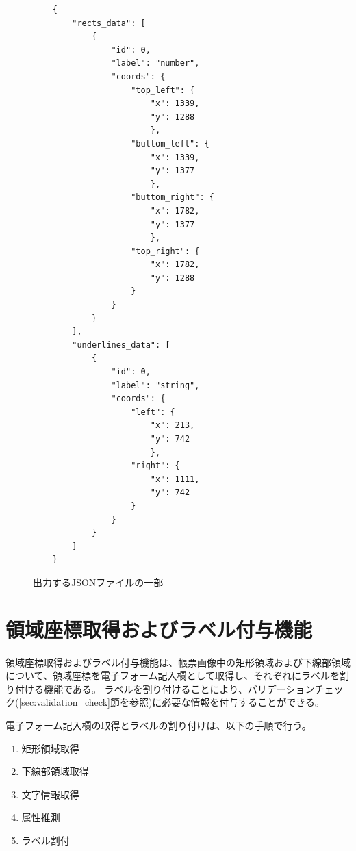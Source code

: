 \lstset{language=}
\begin{figure}[t]
    \begin{lstlisting}
    {
        "rects_data": [
            {
                "id": 0, 
                "label": "number",
                "coords": {
                    "top_left": {
                        "x": 1339,
                        "y": 1288
                        },
                    "buttom_left": {
                        "x": 1339,
                        "y": 1377
                        },
                    "buttom_right": {
                        "x": 1782,
                        "y": 1377
                        },
                    "top_right": {
                        "x": 1782,
                        "y": 1288
                    }
                }
            }
        ],
        "underlines_data": [
            {
                "id": 0,
                "label": "string",
                "coords": {
                    "left": {
                        "x": 213,
                        "y": 742
                        },
                    "right": {
                        "x": 1111,
                        "y": 742
                    }
                }
            }
        ]
    }
    \end{lstlisting}
    \caption{出力するJSONファイルの一部}\label{fig:example_output_json}
\end{figure}

\section{領域座標取得およびラベル付与機能}\label{sec:eform_write_space_obtainment_feature}
領域座標取得およびラベル付与機能は、帳票画像中の矩形領域および下線部領域について、領域座標を電子フォーム記入欄として取得し、それぞれにラベルを割り付ける機能である。
ラベルを割り付けることにより、バリデーションチェック(\ref{sec:validation_check}節を参照)に必要な情報を付与することができる。

電子フォーム記入欄の取得とラベルの割り付けは、以下の手順で行う。

\begin{enumerate}
    \item 矩形領域取得
    \item 下線部領域取得
    \item 文字情報取得
    \item 属性推測
    \item ラベル割付
\end{enumerate}


